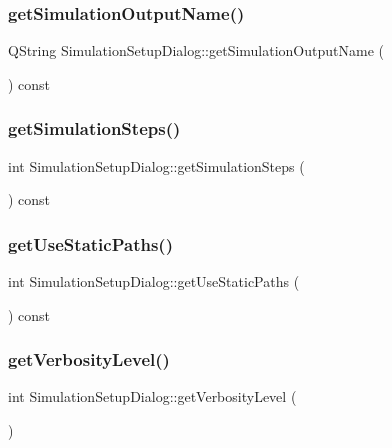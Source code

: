 \subsubsection{\texorpdfstring{getSimulationOutputName()}{getSimulationOutputName()}}
{\footnotesize\ttfamily Q\+String Simulation\+Setup\+Dialog\+::get\+Simulation\+Output\+Name (\begin{DoxyParamCaption}{ }\end{DoxyParamCaption}) const}

\mbox{\label{class_simulation_setup_dialog_a7f747d753edac855918d94d2f49c5989}} 
\subsubsection{\texorpdfstring{getSimulationSteps()}{getSimulationSteps()}}
{\footnotesize\ttfamily int Simulation\+Setup\+Dialog\+::get\+Simulation\+Steps (\begin{DoxyParamCaption}{ }\end{DoxyParamCaption}) const}

\mbox{\label{class_simulation_setup_dialog_abe5652dc5074d47f9d368657d06bad39}} 
\subsubsection{\texorpdfstring{getUseStaticPaths()}{getUseStaticPaths()}}
{\footnotesize\ttfamily int Simulation\+Setup\+Dialog\+::get\+Use\+Static\+Paths (\begin{DoxyParamCaption}{ }\end{DoxyParamCaption}) const}

\mbox{\label{class_simulation_setup_dialog_a89e83c85e2cea94233ee989395144110}} 
\subsubsection{\texorpdfstring{getVerbosityLevel()}{getVerbosityLevel()}}
{\footnotesize\ttfamily int Simulation\+Setup\+Dialog\+::get\+Verbosity\+Level (\begin{DoxyParamCaption}{ }\end{DoxyParamCaption})}

